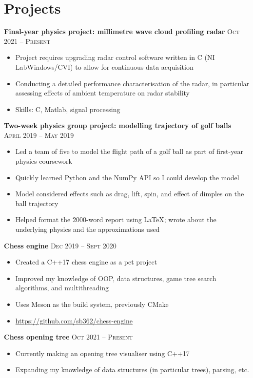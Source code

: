 \documentclass{article}
\begin{document}
	\section*{Projects}
		\textbf{Final-year physics project: millimetre wave cloud profiling radar} \hfill \textsc{Oct 2021 -- Present}
		\begin{itemize}
			\item Project requires upgrading radar control software written in C (NI LabWindows/CVI) to allow for continuous data acquisition
			\item Conducting a detailed performance characterisation of the radar, in particular assessing effects of ambient temperature on radar stability
			\item Skills: C, Matlab, signal processing
		\end{itemize}
		\bigskip
		\textbf{Two-week physics group project: modelling trajectory of golf balls} \hfill \textsc{April 2019 -- May 2019}
		\begin{itemize}
			\item Led a team of five to model the flight path of a golf ball as part of first-year physics coursework
			\item Quickly learned Python and the NumPy API so I could develop the model
			\item Model considered effects such as drag, lift, spin, and effect of dimples on the ball trajectory
			\item Helped format the 2000-word report using \LaTeX ; wrote about the underlying physics and the approximations used
		\end{itemize}
		\bigskip
		\textbf{Chess engine} \hfill \textsc{Dec 2019 -- Sept 2020}
		\begin{itemize}
			\item Created a C++17 chess engine as a pet project
			\item Improved my knowledge of OOP, data structures, game tree search algorithms, and multithreading
			\item Uses Meson as the build system, previously CMake
			\item \url{https://github.com/sb362/chess-engine}
		\end{itemize}
		\bigskip
		\textbf{Chess opening tree} \hfill \textsc{Oct 2021 -- Present}
		\begin{itemize}
			\item Currently making an opening tree visualiser using C++17
			\item Expanding my knowledge of data structures (in particular trees), parsing, etc.
		\end{itemize}
	
\end{document}
